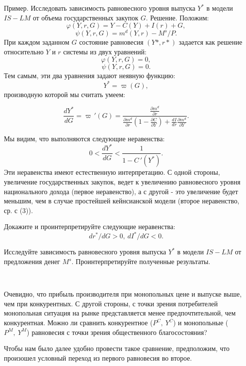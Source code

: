    Пример. Исследовать зависимость равновесного уровня выпуска $Y^{*}$ в
    модели $IS-LM$ от объема государственных закупок $G$.
    Решение. Положим:
    \[\varphi (Y,r,G)=Y-C(Y)+I(r)+G,\]
    \[\psi (Y,r,G)=m^{d}(Y,r)-M^{s}/P.\]
    При каждом заданном $G$ состояние равновесия $(Y*,r*)$ задается как
    решение относительно $Y$ и $r$ системы из двух уравнений:
    \[\varphi (Y,r,G)=0,\]
    \[\psi (Y,r,G)=0.\]
    Тем самым, эти два уравнения задают неявную функцию:
    \[Y^{*}=\varpi(G),\]
    производную которой мы считать умеем:

    \[\frac{dY^{*}}{dG}=\varpi\,'(G)=\frac{\frac{\partial m^{d}}{\partial r}}
    {\frac{\partial m^{d}}{\partial r}\left(1-\frac{\partial C}{\partial Y}\right)
    +\frac{dI}{dr}\frac{\partial m^{d}}{\partial Y}}.\]


    Мы видим, что выполняются следующие неравенства:
    \[0<\frac{dY^{*}}{dG}<\frac{1}{1-C\,'(Y^{*})}.\]
    Эти неравенства имеют естественную интерпретацию. С одной стороны,
    увеличение государственных закупок, ведет к увеличению равновесного
    уровня национального дохода (первое неравенство), а с другой -
    это увеличение будет меньшим, чем в случае простейшей
    кейнсианской модели (второе неравенство, ср. с (3)).

\begin{exer}
    Докажите и проинтерпретируйте следующие неравенства:
    \[dr^{*}/dG>0, \   dI^{*}/dG<0.\]
\end{exer}

\begin{exer}
    Исследуйте зависимость равновесного уровня выпуска $Y^{*}$ в модели
    $IS-LM$ от предложения денег $M^{s}$. Проинтерпретируйте полученные результаты.
\end{exer}



\


Очевидно, что прибыль производителя при монопольных цене и выпуске
    выше, чем при конкурентных. С другой стороны, с точки зрения
    потребителей монопольная ситуация на рынке представляется менее
    предпочтительной, чем конкурентная. Можно ли сравнить конкурентное
    ($P^{C}, \ Y^{C}$) и монопольные ($P^{M}, \ Y^{M}$) равновесия
    с точки зрения общественного благосостояния?


    Чтобы нам было далее удобно провести такое сравнение,
    предположим, что произошел условный переход из первого равновесия
    во второе.

